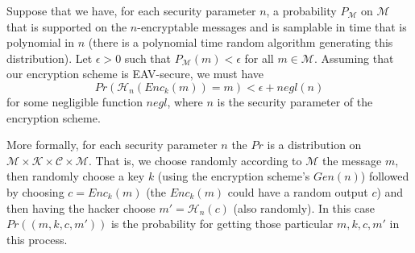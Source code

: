 \documentclass[twoside, a4paper, 10pt]{amsart}
\begin{document}
\begin{prop} Suppose that we have, for each security parameter $n$, a probability $P_{\mathcal{M}}$ on $\mathcal{M}$ that is supported on the $n$-encryptable messages and is samplable in time that is polynomial in $n$ (there is a polynomial time random algorithm generating this distribution). Let $\epsilon>0$ such that $P_{\mathcal{M}}(m) < \epsilon$ for all  $m \in \mathcal{M}$. Assuming that our encryption scheme is EAV-secure, we must have $$Pr(\mathcal{H}_n(Enc_k(m)) = m) < \epsilon + negl(n)$$ for some negligible function $negl$, where $n$ is the security parameter of the encryption scheme. 

\end{prop}

More formally, for each security parameter $n$ the $Pr$ is a distribution on $\mathcal{M} \times \mathcal{K} \times \mathcal{C} \times \mathcal{M}$. That is, we choose randomly according to $\mathcal{M}$ the message $m$, then randomly choose a key $k$ (using the encryption scheme's $Gen(n)$) followed by choosing $c = Enc_k(m)$ (the $Enc_k(m)$ could have a random output $c$) and then having the hacker choose $m' = \mathcal{H}_n(c)$ (also randomly). In this case $Pr((m,k,c,m'))$ is the probability for getting those particular $m,k,c,m'$ in this process.
\end{document}
